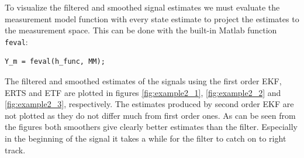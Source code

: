 To visualize the filtered and smoothed signal estimates we must
evaluate the measurement model function with every state estimate to
project the estimates to the measurement space. This can be done with
the built-in Matlab function \texttt{feval}:
%
\begin{lstlisting} 
Y_m = feval(h_func, MM);
\end{lstlisting}
%
The filtered and smoothed estimates of the signals using the first
order EKF, ERTS and ETF are plotted in figures \ref{fig:example2_1},
\ref{fig:example2_2} and \ref{fig:example2_3}, respectively. The
estimates produced by second order EKF are not plotted as they do not
differ much from first order ones.  As can be seen from the figures
both smoothers give clearly better estimates than the
filter. Especially in the beginning of the signal it takes a while for
the filter to catch on to right track.


\label{page:sine_rmse}

